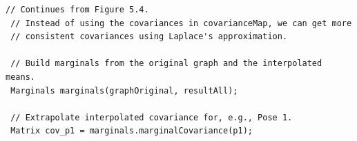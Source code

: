 \documentclass[border=1pt]{standalone}
\begin{document}
\begin{listingbox}
\begin{lstlisting}[style=C++Style, firstnumber=67]
 // Continues from Figure 5.4.
 // Instead of using the covariances in covarianceMap, we can get more
 // consistent covariances using Laplace's approximation.

 // Build marginals from the original graph and the interpolated means.
 Marginals marginals(graphOriginal, resultAll);

 // Extrapolate interpolated covariance for, e.g., Pose 1.
 Matrix cov_p1 = marginals.marginalCovariance(p1);
\end{lstlisting}
\end{listingbox}
\end{document}

